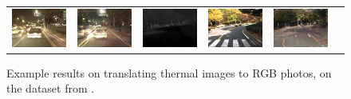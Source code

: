 \begin{figure}
\begin{center}
\begin{tabular}{cccccc}
\includegraphics[width=0.16666666666667\linewidth]{figs/thermal2rgb_results/thermal2-2.jpg} &
\includegraphics[width=0.16666666666667\linewidth]{figs/thermal2rgb_results/thermal2-3.jpg} \hspace{0.01in} &
\includegraphics[width=0.16666666666667\linewidth]{figs/thermal2rgb_results/thermal2-4.jpg} &
\includegraphics[width=0.16666666666667\linewidth]{figs/thermal2rgb_results/thermal2-5.jpg} &
\includegraphics[width=0.16666666666667\linewidth]{figs/thermal2rgb_results/thermal2-6.jpg} 
\end{tabular} \egroup 
\end{center}
\caption{Example results on translating thermal images to RGB photos, on the dataset from \cite{hwang2015multispectral}.}
\label{thermal2rgb}
\end{figure}
